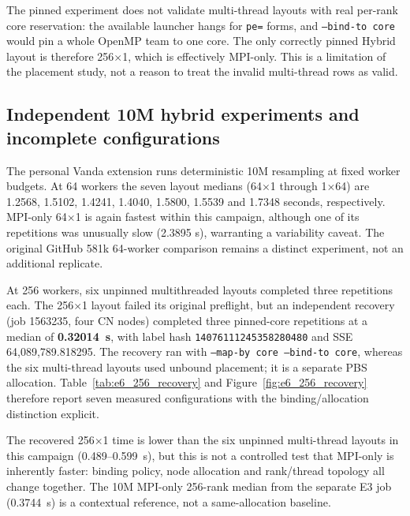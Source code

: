 \documentclass[10pt,a4paper]{article}
\newcommand{\code}[1]{\texttt{#1}}
\begin{document}
The pinned experiment does not validate multi-thread layouts with real
per-rank core reservation: the available launcher hangs for \code{pe=} forms,
and \code{--bind-to core} would pin a whole OpenMP team to one core. The only
correctly pinned Hybrid layout is therefore 256$\times$1, which is effectively
MPI-only. This is a limitation of the placement study, not a reason to treat
the invalid multi-thread rows as valid.

\subsection{Independent 10M hybrid experiments and incomplete configurations}
The personal Vanda extension runs deterministic 10M resampling at fixed worker budgets. At 64 workers the seven layout medians (64$\times$1 through 1$\times$64) are 1.2568, 1.5102, 1.4241, 1.4040, 1.5800, 1.5539 and 1.7348 seconds, respectively. MPI-only 64$\times$1 is again fastest within this campaign, although one of its repetitions was unusually slow (2.3895 s), warranting a variability caveat. The original GitHub 581k 64-worker comparison remains a distinct experiment, not an additional replicate.

At 256 workers, six unpinned multithreaded layouts completed three repetitions each. The 256$\times$1 layout failed its original preflight, but an independent recovery (job 1563235, four CN nodes) completed three pinned-core repetitions at a median of \textbf{0.32014~s}, with label hash \code{14076111245358280480} and SSE 64,089,789.818295. The recovery ran with \code{--map-by core --bind-to core}, whereas the six multi-thread layouts used unbound placement; it is a separate PBS allocation. Table~\ref{tab:e6_256_recovery} and Figure~\ref{fig:e6_256_recovery} therefore report seven measured configurations with the binding/allocation distinction explicit.

The recovered 256$\times$1 time is lower than the six unpinned multi-thread layouts in this campaign (0.489--0.599~s), but this is not a controlled test that MPI-only is inherently faster: binding policy, node allocation and rank/thread topology all change together. The 10M MPI-only 256-rank median from the separate E3 job (0.3744~s) is a contextual reference, not a same-allocation baseline.

\begin{table}[H]
\centering\small
\caption{Personal Vanda 10M Hybrid at 256 workers. The first six rows are the unpinned original campaign; the last row is the separate pinned 256$\times$1 recovery. Medians of three repetitions.}
\label{tab:e6_256_recovery}

\end{table}
\end{document}
